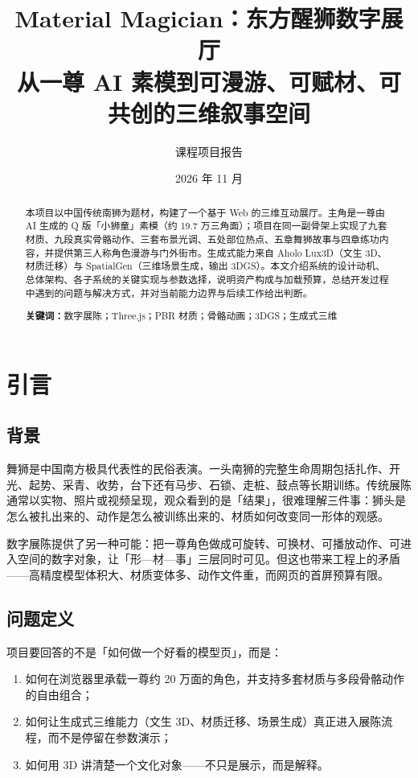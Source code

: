 \documentclass[UTF8,a4paper,11pt]{ctexart}
\title{\textbf{Material Magician：东方醒狮数字展厅}\\[4pt]
\large 从一尊 AI 素模到可漫游、可赋材、可共创的三维叙事空间}
\author{课程项目报告}
\date{2026 年 11 月}
\begin{document}
\maketitle

\begin{abstract}
本项目以中国传统南狮为题材，构建了一个基于 Web 的三维互动展厅。主角是一尊由 AI 生成的 Q 版「小狮童」素模（约 19.7 万三角面）；项目在同一副骨架上实现了九套材质、九段真实骨骼动作、三套布景光调、五处部位热点、五章舞狮故事与四章练功内容，并提供第三人称角色漫游与门外街市。生成式能力来自 Aholo Lux3D（文生 3D、材质迁移）与 SpatialGen（三维场景生成，输出 3DGS）。本文介绍系统的设计动机、总体架构、各子系统的关键实现与参数选择，说明资产构成与加载预算，总结开发过程中遇到的问题与解决方式，并对当前能力边界与后续工作给出判断。

\vspace{6pt}
\noindent\textbf{关键词：}数字展陈；Three.js；PBR 材质；骨骼动画；3DGS；生成式三维
\end{abstract}

\tableofcontents
\newpage

\section{引言}

\subsection{背景}
舞狮是中国南方极具代表性的民俗表演。一头南狮的完整生命周期包括扎作、开光、起势、采青、收势，台下还有马步、石锁、走桩、鼓点等长期训练。传统展陈通常以实物、照片或视频呈现，观众看到的是「结果」，很难理解三件事：狮头是怎么被扎出来的、动作是怎么被训练出来的、材质如何改变同一形体的观感。

数字展陈提供了另一种可能：把一尊角色做成可旋转、可换材、可播放动作、可进入空间的数字对象，让「形—材—事」三层同时可见。但这也带来工程上的矛盾——高精度模型体积大、材质变体多、动作文件重，而网页的首屏预算有限。

\subsection{问题定义}
项目要回答的不是「如何做一个好看的模型页」，而是：
\begin{enumerate}[itemsep=2pt]
  \item 如何在浏览器里承载一尊约 20 万面的角色，并支持多套材质与多段骨骼动作的自由组合；
  \item 如何让生成式三维能力（文生 3D、材质迁移、场景生成）真正进入展陈流程，而不是停留在参数演示；
  \item 如何用 3D 讲清楚一个文化对象——不只是展示，而是解释。
\end{enumerate}
\end{document}
